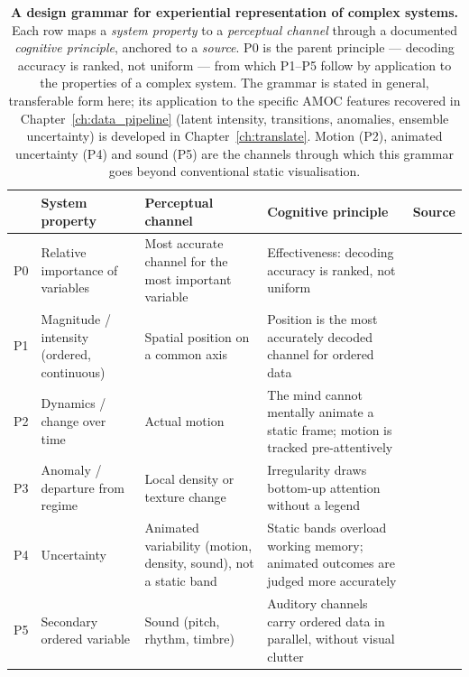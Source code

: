 \begin{table}[!ht]
    \centering
    \small
    \caption[A design grammar for experiential representation of complex systems.]{\textbf{A design grammar for experiential representation of complex systems.}
             Each row maps a \emph{system property} to a \emph{perceptual channel} through a
             documented \emph{cognitive principle}, anchored to a \emph{source}. P0 is the parent
             principle --- decoding accuracy is ranked, not uniform --- from which P1--P5 follow
             by application to the properties of a complex system. The grammar is stated in
             general, transferable form here; its application to the specific AMOC features
             recovered in Chapter~\ref{ch:data_pipeline} (latent intensity, transitions, anomalies,
             ensemble uncertainty) is developed in Chapter~\ref{ch:translate}. Motion (P2),
             animated uncertainty (P4) and sound (P5) are the channels through which this
             grammar goes beyond conventional static visualisation.}
    \label{tab:design-grammar}
    \begin{tabular}{@{}p{0.5cm}p{2.5cm}p{2.9cm}p{3.3cm}p{2.3cm}@{}}
        \toprule
        & \textbf{System property} & \textbf{Perceptual channel} & \textbf{Cognitive principle} & \textbf{Source} \\
        \midrule
        P0 & Relative importance of variables
           & Most accurate channel for the most important variable
           & Effectiveness: decoding accuracy is ranked, not uniform
           & \citet{bertin1983, clevelandmcgill1984, munzner2014} \\[0.4em]
        P1 & Magnitude / intensity (ordered, continuous)
           & Spatial position on a common axis
           & Position is the most accurately decoded channel for ordered data
           & \citet{clevelandmcgill1984, tversky2019} \\[0.4em]
        P2 & Dynamics / change over time
           & Actual motion
           & The mind cannot mentally animate a static frame; motion is tracked pre-attentively
           & \citet{sterman2008, cronin2009, ware2021} \\[0.4em]
        P3 & Anomaly / departure from regime
           & Local density or texture change
           & Irregularity draws bottom-up attention without a legend
           & \citet{bertin1983, ware2021} \\[0.4em]
        P4 & Uncertainty
           & Animated variability (motion, density, sound), not a static band
           & Static bands overload working memory; animated outcomes are judged more accurately
           & \citet{padilla2018, hullman2015hops, kale2019hops} \\[0.4em]
        P5 & Secondary ordered variable
           & Sound (pitch, rhythm, timbre)
           & Auditory channels carry ordered data in parallel, without visual clutter
           & \citet{hermann2011} \\
        \bottomrule
    \end{tabular}
\end{table}

